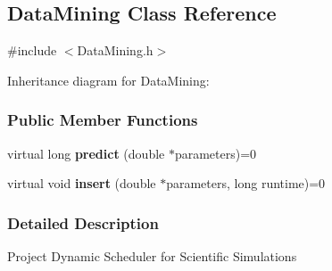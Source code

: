 \hypertarget{a00013}{}\subsection{Data\+Mining Class Reference}
\label{a00013}


{\ttfamily \#include $<$Data\+Mining.\+h$>$}



Inheritance diagram for Data\+Mining\+:
\subsubsection*{Public Member Functions}
\begin{DoxyCompactItemize}
\item 
\hypertarget{a00013_a03b115a9db40dde60012bde4e4491966}{}virtual long {\bfseries predict} (double $\ast$parameters)=0\label{a00013_a03b115a9db40dde60012bde4e4491966}

\item 
\hypertarget{a00013_ae4a8f82a2356d0b45d0e3c750a67aa5c}{}virtual void {\bfseries insert} (double $\ast$parameters, long runtime)=0\label{a00013_ae4a8f82a2356d0b45d0e3c750a67aa5c}

\end{DoxyCompactItemize}


\subsubsection{Detailed Description}
Project Dynamic Scheduler for Scientific Simulations 